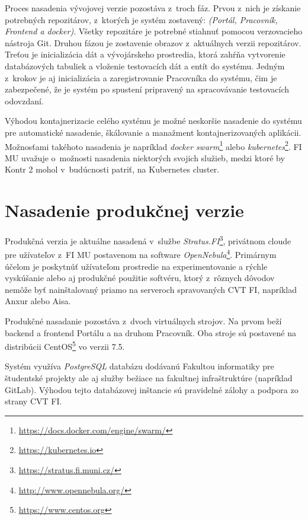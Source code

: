 \documentclass[
  digital, %
  oneside, %
  table,   %
  lof,     %
  lot,   %
]{fithesis3}
\newcommand*{\footurl}[1]{\footnote{\url{#1}}}
\begin{document}
Proces nasadenia vývojovej verzie pozostáva z~troch fáz. Prvou z~nich je získanie potrebných repozitárov, z~ktorých je systém zostavený: \emph{(Portál, Pracovník, Frontend a docker)}. Všetky repozitáre je potrebné stiahnuť pomocou verzovacieho nástroja Git. Druhou fázou je zostavenie obrazov z~aktuálnych verzii repozitárov. Treťou je inicializácia dát a vývojárskeho prostredia, ktorá zahŕňa vytvorenie databázových tabuliek a vloženie testovacích dát a entít do systému. Jedným z~krokov je aj inicializácia a zaregistrovanie Pracovníka do systému, čim je zabezpečené, že je systém po spustení pripravený na spracovávanie testovacích odovzdaní.

Výhodou kontajnerizacie celého systému je možné neskoršie nasadenie do systému pre automatické nasadenie, škálovanie a manažment kontajnerizovaných aplikácii. Možnosťami takéhoto nasadenia je napríklad \emph{docker swarm}\footnote{\url{https://docs.docker.com/engine/swarm/}} alebo \emph{kubernetes}\footnote{\url{https://kubernetes.io}}. FI MU uvažuje o~možnosti nasadenia niektorých svojich služieb, medzi ktoré by Kontr 2 mohol v~budúcnosti patriť, na Kubernetes cluster. 

\section{Nasadenie produkčnej verzie}
\label{deploy-prod}

Produkčná verzia je aktuálne nasadená v~službe \emph{Stratus.FI}\footnote{\url{https://stratus.fi.muni.cz/}}, privátnom cloude pre užívateľov z~FI MU postavenom na software \emph{OpenNebula}\footnote{\url{http://www.opennebula.org/}}.
Primárnym účelom je poskytnúť užívateľom prostredie na experimentovanie a rýchle vyskúšanie alebo aj produkčné použitie softvéru, ktorý z~rôznych dôvodov nemôže byť nainštalovaný priamo na serveroch spravovaných CVT FI, napríklad Anxur alebo Aisa\cite{fi-tech-stratus}.

Produkčné nasadanie pozostáva z~dvoch virtuálnych strojov. Na prvom beží backend a frontend Portálu a na druhom Pracovník. Oba stroje sú postavené na distribúcii CentOS\footurl{https://www.centos.org} vo verzii 7.5.

Systém využíva \emph{PostgreSQL} databázu dodávanú Fakultou informatiky pre študentské projekty ale aj služby bežiace na fakultnej infraštruktúre (napríklad GitLab). Výhodou tejto databázovej inštancie sú pravidelné zálohy a podpora zo strany CVT FI.
\end{document}
